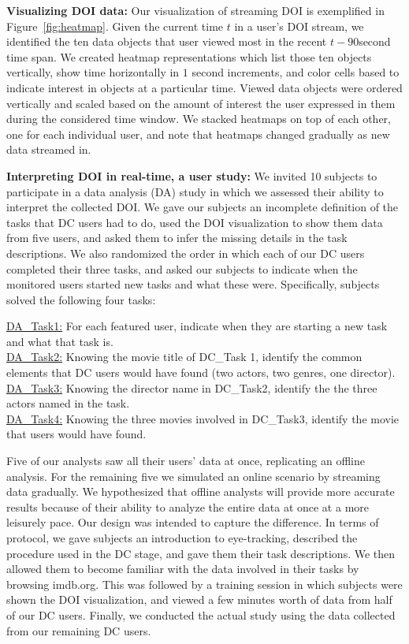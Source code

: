 \textbf{Visualizing DOI data:}  Our visualization of streaming DOI is exemplified in Figure~\ref{fig:heatmap}. Given the current time $t$ in a user's DOI stream, we identified the ten data objects that user viewed most in the recent $t-90$second time span. We created heatmap representations which list those ten objects vertically, show time horizontally in $1$ second increments, and color cells based to indicate interest in objects at a particular time. Viewed data objects were ordered vertically and scaled based on the amount of interest the user expressed in them during the considered time window. We stacked heatmaps on top of each other, one for each individual user, and note that heatmaps changed gradually as new data streamed in.

\textbf{Interpreting DOI in real-time, a user study:} We invited 10 subjects to participate in a data analysis (DA) study in which we assessed their ability to interpret the collected DOI. We gave our subjects an incomplete definition of the tasks that DC users had to do, used the DOI visualization to show them data from five users, and asked them to infer the missing details in the task descriptions. We also randomized the order in which each of our DC users completed their three tasks, and asked our subjects to indicate when the monitored users started new tasks and what these were. Specifically, subjects solved the following four tasks:  


\noindent
\underline{DA\_Task1:} For each featured user, indicate when they are starting a new task and what that task is.\\
\underline{DA\_Task2:} Knowing the movie title of DC\_Task 1, identify the common elements that DC users would have found (two actors, two genres, one director).\\
\underline{DA\_Task3:} Knowing the director name in DC\_Task2, identify the the three actors named in the task.\\
\underline{DA\_Task4:} Knowing the three movies involved in DC\_Task3, identify the movie that users would have found. 

Five of our analysts saw all their users’ data at once, replicating an offline analysis. For the remaining five we simulated an online scenario  by streaming data gradually. We hypothesized that offline analysts will provide more accurate results because of their ability to analyze the entire data at once at a more leisurely pace. Our design was intended to capture the difference.  In terms of protocol, we gave subjects an introduction to eye-tracking, described the procedure used in the DC stage, and gave them their task descriptions. We then allowed them to become familiar with the data involved in their tasks by browsing imdb.org. This was followed by a training session in which subjects were shown the DOI visualization, and viewed a few minutes worth of data from half of our DC users. Finally, we conducted the actual study using the data collected from our remaining DC users.   




